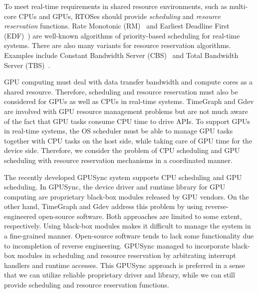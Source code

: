 To meet real-time requirements in shared resource environments, such as
multi-core CPUs and GPUs, RTOSes should provide \textit{scheduling} and
\textit{resource reservation} functions.
Rate Monotonic (RM)~\cite{sched:rm} and Earliest Deadline First
(EDF)~\cite{sched:edf}) are well-known algorithms of priority-based
scheduling for real-time systems.
There are also many variants for resource reservation algorithms.
Examples include Constant Bandwidth Server (CBS)~\cite{rr:cbs} and Total
Bandwidth Server (TBS)~\cite{rr:tbs2}.

GPU computing must deal with data transfer bandwidth and compute cores
as a shared resource.
Therefore, scheduling and resource reservation must also be considered
for GPUs as well as CPUs in real-time systems.
TimeGraph and Gdev are involved with GPU resource management problems
but are not much aware of the fact that GPU tasks consume CPU time to
drive APIs.
To support GPUs in real-time systems, the OS scheduler must be able to
manage GPU tasks together with CPU tasks on the host side, while taking
care of GPU time for the device side.
Therefore, we consider the problem of CPU scheduling and GPU scheduling
with resource reservation mechanisms in a coordinated manner.

The recently developed GPUSync system supports CPU scheduling and GPU
scheduling.
In GPUSync, the device driver and runtime library for GPU computing are
proprietary black-box modules released by GPU vendors.
On the other hand, TimeGraph and Gdev address this problem by using
reverse-engineered open-source software.
Both approaches are limited to some extent, respectively.
Using black-box modules makes it difficult to manage the system in a
fine-grained manner.
Open-source software tends to lack some functionality due to
incompletion of reverse engineering.
GPUSync managed to incorporate black-box modules in scheduling and
resource reservation by arbitrating interrupt handlers and runtime
accesses.
This GPUSync approach is preferred in a sense that we can utilize
reliable proprietary driver and library, while we can still provide
scheduling and resource reservation functions.

